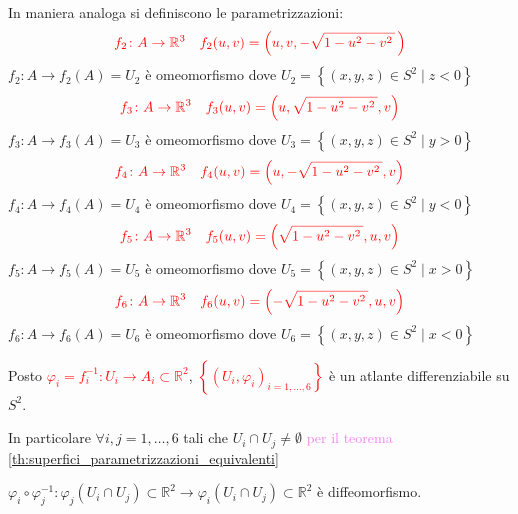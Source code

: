 \begin{esempio}
\begin{center}
        \end{center}
        In maniera analoga si definiscono le parametrizzazioni:
        \[ \color{red} f_2 \colon A \to \mathbb{R}^3 \quad f_2(u,v)= \left(u,v, -\sqrt{1-u^2-v^2 \,} \,\right) \]
        $f_2 \colon A \to f_2(A)=U_2$ è omeomorfismo dove $U_2 = \left\{ (x,y,z) \in S^2 \mid z < 0 \right\}$
        \[ \color{red} f_3 \colon A \to \mathbb{R}^3 \quad f_3(u,v)= \left(u,\sqrt{1-u^2-v^2 \,}, v \right) \]
        $f_3 \colon A \to f_3(A)=U_3$ è omeomorfismo dove $U_3 = \left\{ (x,y,z) \in S^2 \mid y > 0 \right\}$
        \[ \color{red} f_4 \colon A \to \mathbb{R}^3 \quad f_4(u,v)= \left(u,-\sqrt{1-u^2-v^2 \,}, v \right) \]
        $f_4 \colon A \to f_4(A)=U_4$ è omeomorfismo dove $U_4 = \left\{ (x,y,z) \in S^2 \mid y < 0 \right\}$
        \[ \color{red} f_5 \colon A \to \mathbb{R}^3 \quad f_5(u,v)= \left(\sqrt{1-u^2-v^2 \,}, u, v \right) \]
        $f_5 \colon A \to f_5(A)=U_5$ è omeomorfismo dove $U_5 = \left\{ (x,y,z) \in S^2 \mid x > 0 \right\}$
        \[ \color{red} f_6 \colon A \to \mathbb{R}^3 \quad f_6(u,v)= \left(-\sqrt{1-u^2-v^2 \,}, u, v \right) \]
        $f_6 \colon A \to f_6(A)=U_6$ è omeomorfismo dove $U_6 = \left\{ (x,y,z) \in S^2 \mid x < 0 \right\}$

        Posto \textcolor{red}{$\varphi_i = f_i^{-1} \colon U_i \to A_i \subset \mathbb{R}^2$}, \textcolor{red}{$\left\{\left(U_i, \varphi_i\right)_{i=1,\dots,6}\right\}$} è un atlante
        differenziabile su $S^2$.

        In particolare $\forall i,j = 1,\dots,6$ tali che $U_i \cap U_j \neq \emptyset$ \textcolor{violet}{per il teorema \ref{th:superfici_parametrizzazioni_equivalenti}}
        
        $\varphi_i \circ \varphi_j^{-1} \colon \varphi_j(U_i \cap U_j) \subset \mathbb{R}^2 \to \varphi_i(U_i \cap U_j) \subset \mathbb{R}^2$ 
        è diffeomorfismo.
        \end{esempio}
        \newpage
